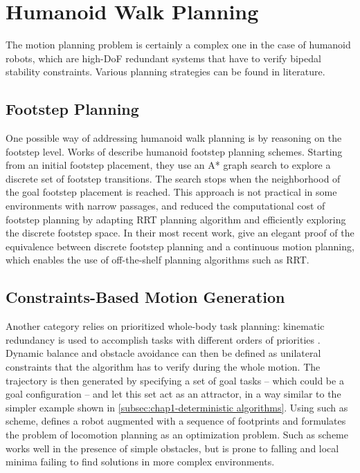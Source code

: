 \section{Humanoid Walk Planning}
\label{sec:chap1-humanoid-walk-planning}

The motion planning problem is certainly a complex one in the case of
humanoid robots, which are high-DoF redundant systems that have to
verify bipedal stability constraints. Various planning strategies can
be found in literature.

\subsection{Footstep Planning}
\label{subsec:chap1-footstep-planning}

One possible way of addressing humanoid walk planning is by reasoning
on the footstep level. Works of \cite{kuff01,ches05} describe humanoid
footstep planning schemes. Starting from an initial footstep
placement, they use an A* graph search \cite{hart68} to explore a
discrete set of footstep transitions. The search stops when the
neighborhood of the goal footstep placement is reached. This approach
is not practical in some environments with narrow passages, and
\cite{xia09, perr11a} reduced the computational cost of footstep
planning by adapting RRT planning algorithm and efficiently exploring
the discrete footstep space. In their most recent work, \cite{perr11b,
  perr12} give an elegant proof of the equivalence between discrete
footstep planning and a continuous motion planning, which enables the
use of off-the-shelf planning algorithms such as RRT.

\subsection{Constraints-Based Motion Generation}
\label{subsec:chap1-constraints-motion-generation}

Another category relies on prioritized whole-body task planning:
kinematic redundancy is used to accomplish tasks with different orders
of priorities \cite{khat04, saab11}. Dynamic balance and obstacle
avoidance can then be defined as unilateral constraints that the
algorithm has to verify during the whole motion. The trajectory is
then generated by specifying a set of goal tasks -- which could be a
goal configuration -- and let this set act as an attractor, in a way
similar to the simpler example shown in
\ref{subsec:chap1-deterministic algorithms}. Using such as scheme,
\cite{kano09} defines a robot augmented with a sequence of footprints
and formulates the problem of locomotion planning as an optimization
problem. Such as scheme works well in the presence of simple
obstacles, but is prone to falling and local minima failing to find
solutions in more complex environments.

